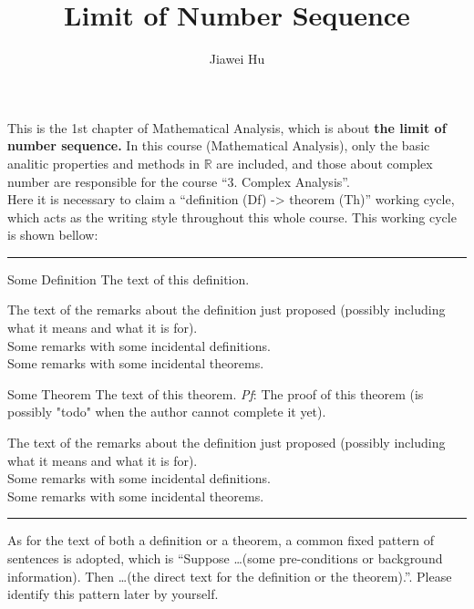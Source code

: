 \documentclass{article}
\title{\LARGE \textbf{Limit of Number Sequence}}
\author{\large Jiawei Hu}
\begin{document}
\maketitle

This is the 1st chapter of Mathematical Analysis, which is about \textbf{the limit of number sequence.} In this course (Mathematical Analysis), only the basic analitic properties and methods in $\mathbb{R}$ are included, and those about complex number are responsible for the course ``3. Complex Analysis''.\\
Here it is necessary to claim a ``definition (Df) -> theorem (Th)'' working cycle, which acts as the writing style throughout this whole course. This working cycle is shown bellow:

\noindent\rule{\textwidth}{2pt}
\begin{Df}{Some Definition}
    The text of this definition.
\end{Df}

\begin{Rmk}{}
    The text of the remarks about the definition just proposed (possibly including what it means and what it is for).\\
    \textcolor{Df}{Some remarks with some incidental definitions.}\\
    \textcolor{Th}{Some remarks with some incidental theorems.}
\end{Rmk}

\begin{Th}{Some Theorem}
    The text of this theorem.
    \tcblower
    \textit{Pf}: The proof of this theorem (is possibly "todo" when the author cannot complete it yet).
\end{Th}

\begin{Rmk}{}
    The text of the remarks about the definition just proposed (possibly including what it means and what it is for).\\
    \textcolor{Df}{Some remarks with some incidental definitions.}\\
    \textcolor{Th}{Some remarks with some incidental theorems.}
\end{Rmk}
\noindent\rule{\textwidth}{2pt}
As for the text of both a definition or a theorem, a common fixed pattern of sentences is adopted, which is ``Suppose \dots (some pre-conditions or background information). Then \dots (the direct text for the definition or the theorem).''. Please identify this pattern later by yourself. 
\end{document}
